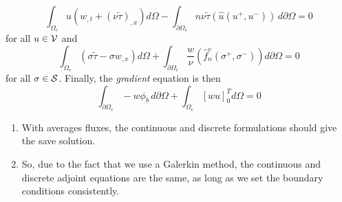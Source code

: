 \documentclass[12pt]{article}
\begin{document}
\begin{equation}
\int_{\Omega_e} u \left( w_{,t} + (\nu\tilde\tau)_{,x} \right) d\Omega -
 \int_{\partial\Omega_e}n\nu\tilde\tau\left(\hat u(u^+,u^-)\right)
\, d\partial\Omega = 0
\end{equation}
for all $u\in{\cal V}$ and
\begin{equation}
 \int_{\Omega_e} \left( \sigma\tilde\tau - \sigma w_{,x} \right) d\Omega +
\int_{\partial\Omega_e} \frac{w}{\nu} \left( \hat f^v_n(\sigma^+,\sigma^-) 
\right) d\partial\Omega = 0
\end{equation} 
for all $\sigma\in{\cal S}$.  Finally, the {\em gradient} equation is then
\begin{equation}
\int_{\partial\Omega_e} -w \phi_b \, d\partial\Omega + 
\int_{\Omega_e} \left[ w u \right]_0^T d\Omega = 0
\end{equation}

\begin{comment}
\begin{equation}
\int_{\Omega_e} u \left( w_{,t} + (\nu\tilde\tau)_{,x} \right) d\Omega +
 \int_{\partial\Omega_e} u \left( 0 - \nu\tilde\tau \right) d\partial\Omega = 0
\end{equation}
for all $u\in{\cal V}$ and
\begin{equation}
 \int_{\Omega_e} \left( \sigma\tilde\tau - \sigma w_{,x} \right) d\Omega = 0
\end{equation} 
for all $\sigma\in{\cal S}$.  Finally, the {\em gradient} equation is then
\begin{equation}
\int_{\partial\Omega_e} -w \phi_b \, d\partial\Omega + 
\int_{\Omega_e} \left[ w u \right]_0^T d\Omega = 0
\end{equation}
\end{comment}

\medskip
{}
\begin{enumerate}
\item With averages fluxes, the continuous and discrete formulations should
  give the save solution.
\item So, due to the fact that we use a Galerkin method, the continuous and
  discrete adjoint equations are the same, as long as we set the boundary
  conditions consistently.
\end{enumerate}

\end{document}
